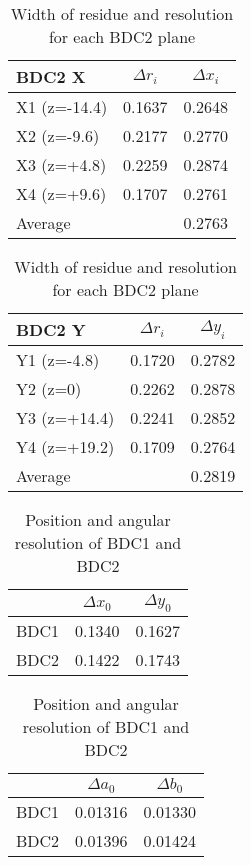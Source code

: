 \begin{table}[h]
    \centering
    \begin{tabular}{l|cc}
    \hline
    BDC2 X & $\Delta r_i$ & $\Delta x_i$     \\
    \hline
    X1 (z=-14.4)&  0.1637 & 0.2648      \\
    X2 (z=-9.6) &  0.2177 & 0.2770      \\
    X3 (z=+4.8) &  0.2259 & 0.2874      \\
    X4 (z=+9.6) &  0.1707 & 0.2761      \\
    \hline
        Average &         & 0.2763 \\
    \hline
    \end{tabular}
    \begin{tabular}{l|cc}
    \hline
     BDC2 Y   & $\Delta r_i$ & $\Delta y_i$ \\
    \hline
         Y1 (z=-4.8)  & 0.1720 & 0.2782 \\
         Y2 (z=0)     & 0.2262 & 0.2878 \\
         Y3 (z=+14.4) & 0.2241 & 0.2852 \\
         Y4 (z=+19.2) & 0.1709 & 0.2764 \\
    \hline
         Average      &        & 0.2819 \\
    \hline
    \end{tabular}
    \caption{Width of residue and resolution for each BDC2 plane}
\end{table}

\begin{table}[h]
    \centering
    \begin{tabular}{c|cc}
        \hline
                &  $\Delta x_0$ & $\Delta y_0$\\
            \hline
            BDC1 & 0.1340 & 0.1627\\
            BDC2 & 0.1422 & 0.1743\\
            \hline
    \end{tabular}
    \begin{tabular}{c|cc}
    \hline
        & $\Delta a_0$ & $\Delta b_0$ \\
        \hline
        BDC1 & 0.01316 & 0.01330 \\
        BDC2 & 0.01396 & 0.01424 \\
        \hline
    \end{tabular}
    \caption{Position and angular resolution of BDC1 and BDC2}
\end{table}

